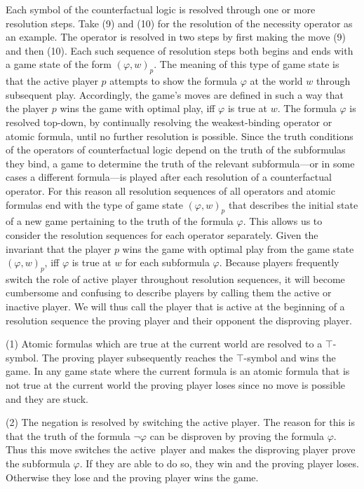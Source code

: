 \documentclass[a4paper,american,10pt]{paper}
\theoremstyle{definition}\newtheorem{definition}{Definition}
\begin{document}
\noindent Each symbol of the counterfactual logic is resolved through one or more resolution steps. Take (9) and (10) for the resolution of the necessity operator as an example. The operator is resolved in two steps by first making the move (9) and then (10). Each such sequence of resolution steps both begins and ends with a game state of the form $(\varphi ,w)_p$. The meaning of this type of game state is that the active player $p$ attempts to show the formula $\varphi$ at the world $w$ through subsequent play. Accordingly, the game's moves are defined in such a way that the player $p$ wins the game with optimal play, iff $\varphi$ is true at $w$. The formula $\varphi$ is resolved top-down, by continually resolving the weakest-binding operator or atomic formula, until no further resolution is possible. Since the truth conditions of the operators of counterfactual logic depend on the truth of the subformulas they bind, a game to determine the truth of the relevant subformula---or in some cases a different formula---is played after each resolution of a counterfactual operator. For this reason all resolution sequences of all operators and atomic formulas end with the type of game state $(\varphi ,w)_p$ that describes the initial state of a new game pertaining to the truth of the formula $\varphi$. This allows us to consider the resolution sequences for each operator separately. Given the invariant that the player $p$ wins the game with optimal play from the game state $(\varphi ,w)_p$, iff $\varphi$ is true at $w$ for each subformula $\varphi$. Because players frequently switch the role of active player throughout resolution sequences, it will become cumbersome and confusing to describe players by calling them the active or inactive player. We will thus call the player that is active at the beginning of a resolution sequence the proving player and their opponent the disproving player.

(1) Atomic formulas which are true at the current world are resolved to a $\top$-symbol. The proving player subsequently reaches the $\top$-symbol and wins the game. In any game state where the current formula is an atomic formula that is not true at the current world the proving player loses since no move is possible and they are stuck.

(2) The negation is resolved by switching the active player. The reason for this is that the truth of the formula $\neg\varphi$ can be disproven by proving the formula $\varphi$. Thus this move switches the active~player and makes the disproving player prove the subformula $\varphi$. If they are able to do so, they win and the proving player loses. Otherwise they lose and the proving player wins the game.
\end{document}
